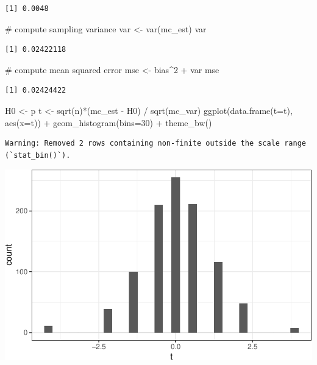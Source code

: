 \documentclass[
  letterpaper,
  DIV=11,
  numbers=noendperiod]{scrreprt}
\newenvironment{Shaded}{\begin{snugshade}}{\end{snugshade}}
\newcommand{\AttributeTok}[1]{\textcolor[rgb]{0.40,0.45,0.13}{#1}}
\newcommand{\CommentTok}[1]{\textcolor[rgb]{0.37,0.37,0.37}{#1}}
\newcommand{\DecValTok}[1]{\textcolor[rgb]{0.68,0.00,0.00}{#1}}
\newcommand{\FunctionTok}[1]{\textcolor[rgb]{0.28,0.35,0.67}{#1}}
\newcommand{\NormalTok}[1]{\textcolor[rgb]{0.00,0.23,0.31}{#1}}
\newcommand{\OtherTok}[1]{\textcolor[rgb]{0.00,0.23,0.31}{#1}}
\newcommand{\SpecialCharTok}[1]{\textcolor[rgb]{0.37,0.37,0.37}{#1}}
\begin{document}
\begin{verbatim}
[1] 0.0048
\end{verbatim}

\begin{Shaded}
\begin{Highlighting}[]
\CommentTok{\# compute sampling variance}
\NormalTok{var }\OtherTok{\textless{}{-}} \FunctionTok{var}\NormalTok{(mc\_est)}
\NormalTok{var}
\end{Highlighting}
\end{Shaded}

\begin{verbatim}
[1] 0.02422118
\end{verbatim}

\begin{Shaded}
\begin{Highlighting}[]
\CommentTok{\# compute mean squared error}
\NormalTok{mse }\OtherTok{\textless{}{-}}\NormalTok{ bias}\SpecialCharTok{\^{}}\DecValTok{2} \SpecialCharTok{+}\NormalTok{ var}
\NormalTok{mse}
\end{Highlighting}
\end{Shaded}

\begin{verbatim}
[1] 0.02424422
\end{verbatim}

\begin{Shaded}
\begin{Highlighting}[]
\NormalTok{H0 }\OtherTok{\textless{}{-}}\NormalTok{ p}
\NormalTok{t }\OtherTok{\textless{}{-}} \FunctionTok{sqrt}\NormalTok{(n)}\SpecialCharTok{*}\NormalTok{(mc\_est }\SpecialCharTok{{-}}\NormalTok{ H0) }\SpecialCharTok{/} \FunctionTok{sqrt}\NormalTok{(mc\_var)}
\FunctionTok{ggplot}\NormalTok{(}\FunctionTok{data.frame}\NormalTok{(}\AttributeTok{t=}\NormalTok{t), }\FunctionTok{aes}\NormalTok{(}\AttributeTok{x=}\NormalTok{t)) }\SpecialCharTok{+}
  \FunctionTok{geom\_histogram}\NormalTok{(}\AttributeTok{bins=}\DecValTok{30}\NormalTok{) }\SpecialCharTok{+}
  \FunctionTok{theme\_bw}\NormalTok{()}
\end{Highlighting}
\end{Shaded}

\begin{verbatim}
Warning: Removed 2 rows containing non-finite outside the scale range
(`stat_bin()`).
\end{verbatim}

\includegraphics{03-estimators_files/figure-pdf/unnamed-chunk-11-1.pdf}
\end{document}
